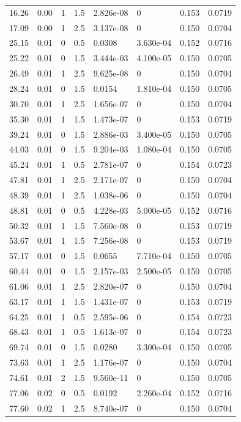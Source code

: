 \documentclass[preview]{standalone}
\begin{document}
{{\begin{tabular}{L{1.2cm}C{1.2cm} C{0.3cm}C{0.5cm} C{1.4cm}C{1.4cm} C{1.4cm}C{1.4cm}}
  16.26  &  0.00  & 1     & 1.5 &  2.826e-08  & 0  & 0.153 &  0.0719   \\ 
  17.09  &  0.00  & 1     & 2.5 &  3.137e-08  & 0  & 0.150 &  0.0704   \\ 
  25.15  &  0.01  & 0     & 0.5 &  0.0308  & 3.630e-04  & 0.152 &  0.0716   \\ 
  25.22  &  0.01  & 0     & 1.5 &  3.444e-03  & 4.100e-05  & 0.150 &  0.0705   \\ 
  26.49  &  0.01  & 1     & 2.5 &  9.625e-08  & 0  & 0.150 &  0.0704   \\ 
  28.24  &  0.01  & 0     & 1.5 &  0.0154  & 1.810e-04  & 0.150 &  0.0705   \\ 
  30.70  &  0.01  & 1     & 2.5 &  1.656e-07  & 0  & 0.150 &  0.0704   \\ 
  35.30  &  0.01  & 1     & 1.5 &  1.473e-07  & 0  & 0.153 &  0.0719   \\ 
  39.24  &  0.01  & 0     & 1.5 &  2.886e-03  & 3.400e-05  & 0.150 &  0.0705   \\ 
  44.03  &  0.01  & 0     & 1.5 &  9.204e-03  & 1.080e-04  & 0.150 &  0.0705   \\ 
  45.24  &  0.01  & 1     & 0.5 &  2.781e-07  & 0  & 0.154 &  0.0723   \\ 
  47.81  &  0.01  & 1     & 2.5 &  2.171e-07  & 0  & 0.150 &  0.0704   \\ 
  48.39  &  0.01  & 1     & 2.5 &  1.038e-06  & 0  & 0.150 &  0.0704   \\ 
  48.81  &  0.01  & 0     & 0.5 &  4.228e-03  & 5.000e-05  & 0.152 &  0.0716   \\ 
  50.32  &  0.01  & 1     & 1.5 &  7.560e-08  & 0  & 0.153 &  0.0719   \\ 
  53.67  &  0.01  & 1     & 1.5 &  7.256e-08  & 0  & 0.153 &  0.0719   \\ 
  57.17  &  0.01  & 0     & 1.5 &  0.0655  & 7.710e-04  & 0.150 &  0.0705   \\ 
  60.44  &  0.01  & 0     & 1.5 &  2.157e-03  & 2.500e-05  & 0.150 &  0.0705   \\ 
  61.06  &  0.01  & 1     & 2.5 &  2.820e-07  & 0  & 0.150 &  0.0704   \\ 
  63.17  &  0.01  & 1     & 1.5 &  1.431e-07  & 0  & 0.153 &  0.0719   \\ 
  64.25  &  0.01  & 1     & 0.5 &  2.595e-06  & 0  & 0.154 &  0.0723   \\ 
  68.43  &  0.01  & 1     & 0.5 &  1.613e-07  & 0  & 0.154 &  0.0723   \\ 
  69.74  &  0.01  & 0     & 1.5 &  0.0280  & 3.300e-04  & 0.150 &  0.0705   \\ 
  73.63  &  0.01  & 1     & 2.5 &  1.176e-07  & 0  & 0.150 &  0.0704   \\ 
  74.61  &  0.01  & 2     & 1.5 &  9.560e-11  & 0  & 0.150 &  0.0705   \\ 
  77.06  &  0.02  & 0     & 0.5 &  0.0192  & 2.260e-04  & 0.152 &  0.0716   \\ 
  77.60  &  0.02  & 1     & 2.5 &  8.740e-07  & 0  & 0.150 &  0.0704   \\ 
\hline 
\end{tabular} 

}}
\end{document}
